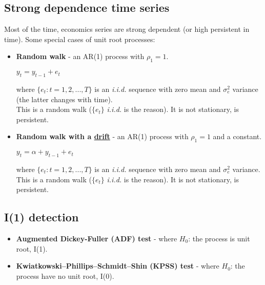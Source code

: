 \documentclass[10pt, a4paper, landscape]{extarticle}
\begin{document}
\begin{multicols}{3}
\columnbreak

\section*{Strong dependence time series}
	Most of the time, economics series are strong dependent (or high persistent in time). Some special cases of unit root processes:
	\begin{itemize}[leftmargin=*]
		\item \textbf{Random walk} - an AR(1) process with $\rho_1 = 1$.
		\begin{center}
			$y_t = y_{t-1} + e_t$
		\end{center}
		where $\lbrace e_t : t = 1, 2, ..., T \rbrace$ is an \textsl{i.i.d.} sequence with zero mean and $\sigma^2_e$ variance (the latter changes with time).
		\\ This is a random walk ($\lbrace e_t \rbrace$ \textsl{i.i.d.} is the reason). It is not stationary, is persistent.
		\item \textbf{Random walk with a \href{https://www.youtube.com/watch?v=pS5d77DQHOI}{drift}} - an AR(1) process with $\rho_1 = 1$ and a constant.
		\begin{center}
			$y_t = \alpha + y_{t-1} + e_t$
		\end{center}
		where $\lbrace e_t : t = 1, 2, ..., T \rbrace$ is an \textsl{i.i.d.} sequence with zero mean and $\sigma^2_e$ variance.
		\\ This is a random walk ($\lbrace e_t \rbrace$ \textsl{i.i.d.} is the reason). It is not stationary, is persistent.
	\end{itemize}
	\subsection*{I(1) detection}
		\begin{itemize}[leftmargin=*]
			\item \textbf{Augmented Dickey-Fuller (ADF) test} - where $H_0$: the process is unit root, I(1).
			\item \textbf{Kwiatkowski–Phillips–Schmidt–Shin (KPSS) test} - where $H_0$: the process have no unit root, I(0).
		\end{itemize}

\end{multicols}
\end{document}
